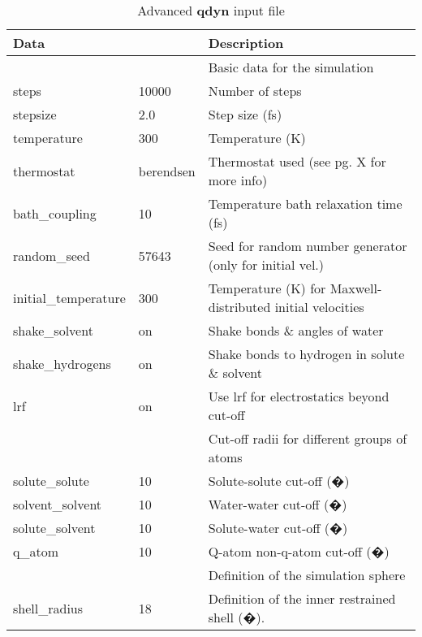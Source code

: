 \documentclass[a4paper,10pt]{article}
\begin{document}
\begin{longtable}{|p{105pt} p{60pt}|p{235pt}|}
\caption{Advanced \textbf{qdyn} input file} \\
  \hline \textbf{Data}            &              & \textbf{Description} \\
  \endhead
  \hline [MD]                     &              & Basic data for the simulation \\
  \hline steps                    & 10000        & Number of steps \\
  \hline stepsize                 & 2.0          & Step size (fs) \\
  \hline temperature              & 300          & Temperature (K) \\
  \hline thermostat               & berendsen    & Thermostat used (see pg. X for more info) \\
  \hline bath{\_}coupling         & 10           & Temperature bath relaxation time (fs) \\
  \hline random{\_}seed           & 57643        & Seed for random number generator (only for initial vel.) \\
  \hline initial{\_}temperature   & 300          & Temperature (K) for Maxwell-distributed initial velocities\\
  \hline shake{\_}solvent         & on           & Shake bonds \& angles of water \\
  \hline shake{\_}hydrogens       & on           & Shake bonds to hydrogen in solute \& solvent \\
  \hline lrf                      & on           & Use lrf for electrostatics beyond cut-off \\
  \hline [cut-offs]               &              & Cut-off radii for different groups of atoms \\
  \hline solute{\_}solute         & 10           & Solute-solute cut-off (�) \\
  \hline solvent{\_}solvent       & 10           & Water-water cut-off (�) \\
  \hline solute{\_}solvent        & 10           & Solute-water cut-off (�) \\
  \hline q{\_}atom                & 10           & Q-atom non-q-atom cut-off (�) \\
  \hline [sphere]                 &              & Definition of the simulation sphere \\
  \hline shell{\_}radius          & 18           & Definition of the inner restrained shell (�). \\

\end{longtable}
\end{document}
